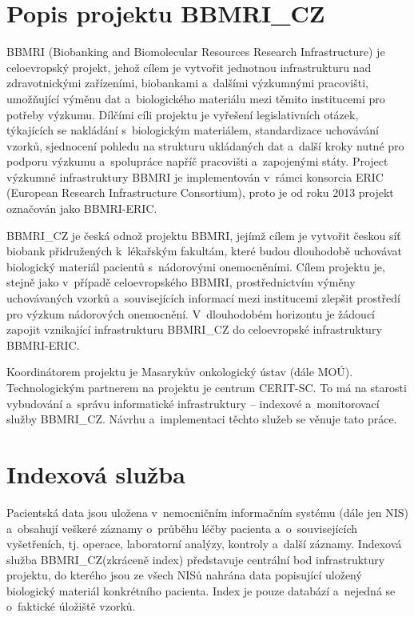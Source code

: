 \documentclass[11pt, draft, oneside]{fithesis2}
\newcommand{\ProjectName}{\mbox{BBMRI\_CZ}\xspace}
\begin{document}
\section{Popis projektu \ProjectName}\label{chapter:analysis:section:projectDescription}
BBMRI (Biobanking and Biomolecular Resources Research Infrastructure) je celoevropský projekt, jehož cílem je vytvořit jednotnou infrastrukturu nad zdravotnickými zařízeními, biobankami a~dalšími výzkumnými pracovišti, umožňující výměnu dat a~biologického materiálu mezi těmito institucemi pro potřeby výzkumu. Dílčími cíli projektu je vyřešení legislativních otázek, týkajících se nakládání s~biologickým materiálem, standardizace uchovávání vzorků, sjednocení pohledu na strukturu ukládaných dat a~další kroky nutné pro podporu výzkumu a~spolupráce napříč pracovišti a~zapojenými státy. Project výzkumné infrastruktury BBMRI je implementován v~rámci konsorcia ERIC (European Research Infrastructure Consortium), proto je od roku 2013 projekt označován jako BBMRI-ERIC.

\ProjectName je česká odnož projektu BBMRI, jejímž cílem je vytvořit českou síť biobank přidružených k~lékařským fakultám, které budou dlouhodobě uchovávat biologický materiál pacientů s~nádorovými onemocněními. Cílem projektu je, stejně jako v~případě celoevropského BBMRI, prostřednictvím výměny uchovávaných vzorků a~souvisejících informací mezi institucemi zlepšit prostředí pro výzkum nádorových onemocnění. V~dlouhodobém horizontu je žádoucí zapojit vznikající infrastrukturu \ProjectName do celoevropské infrastruktury BBMRI-ERIC. 

Koordinátorem projektu je Masarykův onkologický ústav (dále MOÚ). Technologickým partnerem na projektu je centrum CERIT-SC. To má na starosti vybudování a~správu informatické infrastruktury – indexové a~monitorovací služby \ProjectName. Návrhu a~implementaci těchto služeb se věnuje tato práce.

\section{Indexová služba}\label{chapter:analysis:section:index}
Pacientská data jsou uložena v~nemocničním informačním systému (dále jen NIS) a~obsahují veškeré záznamy o~průběhu léčby pacienta a~o~souvisejících vyšetřeních, tj. operace, laboratorní analýzy, kontroly a~další záznamy. Indexová služba \ProjectName (zkráceně index) představuje centrální bod infrastruktury projektu, do kterého jsou ze všech NISů nahrána data popisující uložený biologický materiál konkrétního pacienta. Index je pouze databází a~nejedná se o~faktické úložiště vzorků.
\end{document}
